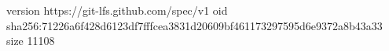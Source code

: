 version https://git-lfs.github.com/spec/v1
oid sha256:71226a6f428d6123df7fffcea3831d20609bf461173297595d6e9372a8b43a33
size 11108
